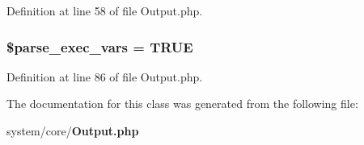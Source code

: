Definition at line 58 of file Output.\-php.

\subsubsection[{\$parse\-\_\-exec\-\_\-vars}]{\setlength{\rightskip}{0pt plus 5cm}\$parse\-\_\-exec\-\_\-vars = T\-R\-U\-E\hspace{0.3cm}{\ttfamily [protected]}}\label{class_c_i___output_a254d73d122352494697cdba0c509086d}


Definition at line 86 of file Output.\-php.



The documentation for this class was generated from the following file\-:\begin{DoxyCompactItemize}
\item 
system/core/{\bf Output.\-php}\end{DoxyCompactItemize}
